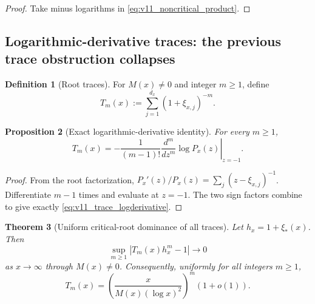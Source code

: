 \documentclass[11pt]{amsart}
\numberwithin{equation}{section}
\theoremstyle{plain}
\newtheorem{theorem}{Theorem}[section]
\newtheorem{proposition}[theorem]{Proposition}
\theoremstyle{definition}
\newtheorem{definition}[theorem]{Definition}
\theoremstyle{remark}
\begin{document}
\begin{proof}
Take minus logarithms in
\eqref{eq:v11_noncritical_product}.
\end{proof}

\subsection{Logarithmic-derivative traces: the previous trace obstruction collapses}
\label{subsec:v11_trace_collapse}

\begin{definition}[Root traces]
\label{def:v11_root_traces}
For \(M(x)\ne0\) and integer \(m\ge1\), define
\begin{equation}
T_m(x):=\sum_{j=1}^{d_x}(1+\xi_{x,j})^{-m}.
\label{eq:v11_Tm}
\end{equation}
\end{definition}

\begin{proposition}[Exact logarithmic-derivative identity]
\label{prop:v11_trace_logderivative}
For every \(m\ge1\),
\begin{equation}
\boxed{
T_m(x)
=-\frac1{(m-1)!}
\left.\frac{d^m}{dz^m}\log P_x(z)\right|_{z=-1}.}
\label{eq:v11_trace_logderivative}
\end{equation}
\end{proposition}

\begin{proof}
From the root factorization,
\(P_x'(z)/P_x(z)=\sum_j(z-\xi_{x,j})^{-1}\).  Differentiate
\(m-1\) times and evaluate at \(z=-1\).  The two sign factors combine to
give exactly \eqref{eq:v11_trace_logderivative}.
\end{proof}

\begin{theorem}[Uniform critical-root dominance of all traces]
\label{thm:v11_trace_dominance}
Let \(h_x=1+\xi_*(x)\).  Then
\begin{equation}
\boxed{
\sup_{m\ge1}|T_m(x)h_x^m-1|\longrightarrow0}
\label{eq:v11_trace_uniform_dominance}
\end{equation}
as \(x\to\infty\) through \(M(x)\ne0\).  Consequently, uniformly for all
integers \(m\ge1\),
\begin{equation}
T_m(x)
=
\left(\frac{x}{M(x)(\log x)^2}\right)^m(1+o(1)).
\label{eq:v11_trace_M_asymptotic}
\end{equation}
\end{theorem}
\end{document}
